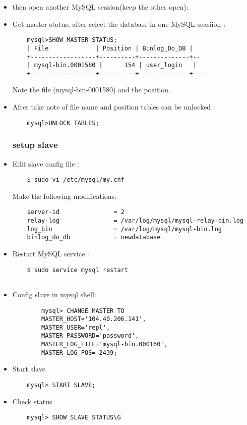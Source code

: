 \begin{itemize}
	\item then open another MySQL seasion(keep the other open):
	
	\item Get master status, after select the database in one MySQL seasiion :
	\begin{verbatim}
	mysql>SHOW MASTER STATUS;
	| File             | Position | Binlog_Do_DB | 
	+------------------+----------+--------------+--
	| mysql-bin.0001580 |      154 | user_login   |          
	+------------------+----------+--------------+----
	\end{verbatim}
	
	Note the file (mysql-bin-0001580) and the position.
	
	\item After take note of file name and position  tables can be unlocked :
	\begin{verbatim}
	mysql>UNLOCK TABLES;
	\end{verbatim}
	
	\subsubsection{setup slave}
	
	\item Edit slave config file :
	\begin{verbatim}
	$ sudo vi /etc/mysql/my.cnf
	\end{verbatim}
		
	Make the following modifications:
	
	\begin{verbatim}
	server-id               = 2
	relay-log               = /var/log/mysql/mysql-relay-bin.log
	log_bin                 = /var/log/mysql/mysql-bin.log
	binlog_do_db            = newdatabase
	\end{verbatim}
	
	\item Restart MySQL service :
	\begin{verbatim}
	$ sudo service mysql restart
	
	\end{verbatim}
			\item Config slave in mysql shell:
	\begin{verbatim}
		mysql> CHANGE MASTER TO
		MASTER_HOST='104.40.206.141',
		MASTER_USER='repl',
		MASTER_PASSWORD='password',
		MASTER_LOG_FILE='mysql-bin.000160',
		MASTER_LOG_POS= 2439;
		\end{verbatim}
	
	\item Start slave
	\begin{verbatim}
	mysql> START SLAVE;
		\end{verbatim}
	
	\item Check status
	\begin{verbatim}
	mysql> SHOW SLAVE STATUS\G
	\end{verbatim}
	
\end{itemize}
